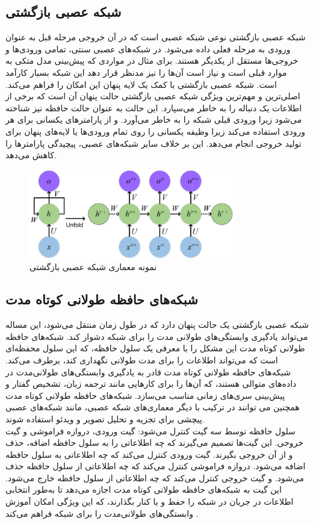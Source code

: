 \subsection{شبکه عصبی بازگشتی}
شبکه عصبی بازگشتی  نوعی شبکه عصبی است که در آن خروجی مرحله قبل به عنوان ورودی به مرحله فعلی داده می‌شود. در شبکه‌های عصبی سنتی، تمامی ورودی‌ها و خروجی‌ها مستقل از یکدیگر 
هستند. برای مثال در مواردی که پیش‌بینی مدل متکی به موارد قبلی است و نیاز است آن‌ها را نیز مدنظر قرار دهد این شبکه بسیار کارآمد است. شبکه عصبی بازگشتی با کمک یک لایه پنهان این امکان را فراهم می‌کند. اصلی‌ترین و مهم‌ترین 
ویژگی شبکه عصبی بازگشتی حالت پنهان آن است که برخی از اطلاعات یک دنباله را به خاطر می‌سپارد. این حالت به عنوان حالت حافظه نیز شناخته می‌شود زیرا ورودی قبلی شبکه را به خاطر می‌آورد. و از پارامترهای یکسانی برای هر 
ورودی استفاده می‌کند زیرا وظیفه یکسانی را روی تمام ورودی‌ها یا لایه‌های پنهان برای تولید خروجی انجام می‌دهد. این بر خلاف سایر شبکه‌های عصبی، پیچیدگی پارامترها را کاهش می‌دهد.


\begin{figure}[h]
    \centering
    \includegraphics[width=0.8\textwidth]{RNN.png}
    \caption[نمونه معماری شبکه عصبی بازگشتی]{نمونه معماری شبکه عصبی بازگشتی\cite{inproceedings}}
\end{figure}

\subsection{شبکه‌های حافظه طولانی کوتاه مدت}
شبکه عصبی بازگشتی یک حالت پنهان دارد که در طول زمان منتقل می‌شود، این مساله می‌تواند یادگیری وابستگی‌های طولانی مدت را برای شبکه دشوار کند. شبکه‌های حافظه طولانی کوتاه مدت
این مشکل را با معرفی یک سلول حافظه، که این سلول محفظه‌ای است که می‌تواند اطلاعات را برای مدت طولانی نگهداری کند، برطرف می‌کند. شبکه‌های حافظه طولانی کوتاه مدت 
 قادر به یادگیری وابستگی‌های طولانی‌مدت در داده‌های متوالی هستند، که آن‌ها را برای کارهایی مانند ترجمه زبان، تشخیص گفتار و پیش‌بینی 
سری‌های زمانی مناسب می‌سازد. شبکه‌های حافظه طولانی کوتاه مدت همچنین می توانند در ترکیب با دیگر معماری‌های شبکه عصبی، مانند شبکه‌های عصبی پیچشی برای تجزیه و تحلیل تصویر و ویدئو استفاده شوند.
\\
سلول حافظه توسط سه گیت کنترل می‌شود: گیت ورودی، دروازه فراموشی و گیت خروجی. این گیت‌ها تصمیم می‌گیرند که چه اطلاعاتی را به سلول حافظه اضافه، حذف  و از آن خروجی بگیرند. گیت ورودی کنترل می‌کند که چه اطلاعاتی 
به سلول حافظه اضافه می‌شود. دروازه فراموشی کنترل می‌کند که چه اطلاعاتی از سلول حافظه حذف می‌شود. و گیت خروجی کنترل می‌کند که چه اطلاعاتی از سلول حافظه خارج می‌‌شود.
این  گیت به شبکه‌های حافظه طولانی کوتاه مدت اجازه می‌دهد تا به‌طور انتخابی اطلاعات در جریان در شبکه را حفظ  و یا کنار بگذارند، که این ویژگی امکان آموزش وابستگی‌های طولانی‌مدت را برای شبکه فراهم می‌کند .

